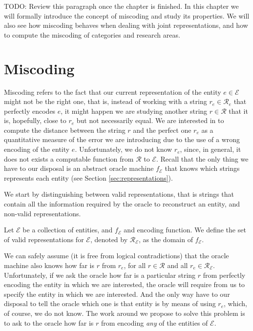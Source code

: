 {\color{red} TODO: Review this paragraph once the chapter is finished.} In this chapter we will formally introduce the concept of miscoding and study its properties. We will also see how miscoding behaves when dealing with joint representations, and how to compute the miscoding of categories and research areas.

%
%
\section{Miscoding}
\label{sec:miscoding}

Miscoding refers to the fact that our current representation of the entity $e \in \mathcal{E}$ might not be the right one, that is, instead of working with a string $r_e \in \mathcal{R}_e$ that perfectly encodes $e$, it might happen we are studying another string $r \in \mathcal{R}$ that it is, hopefully, close to $r_e$ but not necessarily equal. We are interested in to compute the distance between the string $r$ and the perfect one $r_e$ as a quantitative measure of the error we are introducing due to the use of a wrong encoding of the entity $e$. Unfortunately, we do not know $r_e$, since, in general, it does not exists a computable function from $\mathcal{R}$ to $\mathcal{E}$. Recall that the only thing we have to our disposal is an abstract oracle machine $f_\mathcal{E}$ that knows which strings represents each entity (see Section \ref{sec:representations}).

We start by distinguishing between valid representations, that is strings that contain all the information required by the oracle to reconstruct an entity, and non-valid representations.

\begin{definition}
Let $\mathcal{E}$ be a collection of entities, and $f_\mathcal{E}$ and encoding function. We define the set of valid representations for $\mathcal{E}$, denoted by $\mathcal{R}_\mathcal{E}$, as the domain of $f_\mathcal{E}$.
\end{definition}

We can safely assume (it is free from logical contradictions) that the oracle machine also knows how far is $r$ from $r_e$, for all $r \in \mathcal{R}$ and all $r_e \in \mathcal{R}_\mathcal{E}$. Unfortunately, if we ask the oracle how far is a particular string $r$ from perfectly encoding the entity in which we are interested, the oracle will require from us to specify the entity in which we are interested. And the only way have to our disposal to tell the oracle which one is that entity is by means of using $r_e$, which, of course, we do not know. The work around we propose to solve this problem is to ask to the oracle how far is $r$ from encoding \emph{any} of the entities of $\mathcal{E}$.

